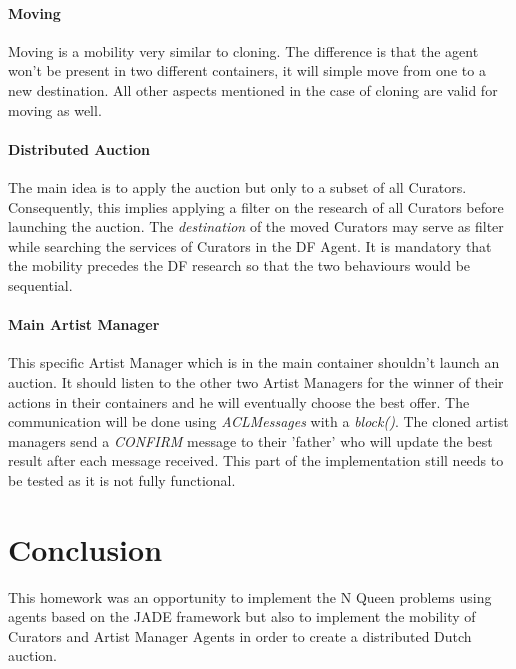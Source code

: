 \documentclass[a4paper,11pt]{article}
\begin{document}
  \paragraph{Moving}

  Moving is a mobility very similar to cloning. The difference is that the agent won't be present in
  two different containers, it will simple move from one to a new destination. All other aspects mentioned
  in the case of cloning are valid for moving as well.

  \paragraph{Distributed Auction}

  The main idea is to apply the auction but only to a subset of all Curators. Consequently, this implies
  applying a filter on the research of all Curators before launching the auction. The \textit{destination}
  of the moved Curators may serve as filter while searching the services of Curators in the DF Agent. It is
  mandatory that the mobility precedes the DF research so that the two behaviours would be sequential.

  \paragraph{Main Artist Manager}
  This specific Artist Manager which is in the main container shouldn't launch an auction. It should listen
  to the other two Artist Managers for the winner of their actions in their containers and he will eventually
  choose the best offer. The communication will be done using \textit{ACLMessages} with a \textit{block()}. The
  cloned artist managers send a \textit{CONFIRM} message to their 'father' who will update the best result
  after each message received. This part of the implementation still needs to be tested as it is not fully functional.

  \section{Conclusion}
  
  This homework was an opportunity to implement the N Queen problems using agents based on the JADE framework
  but also to implement the mobility of Curators and Artist Manager Agents in order to create a distributed
  Dutch auction.
\end{document}
